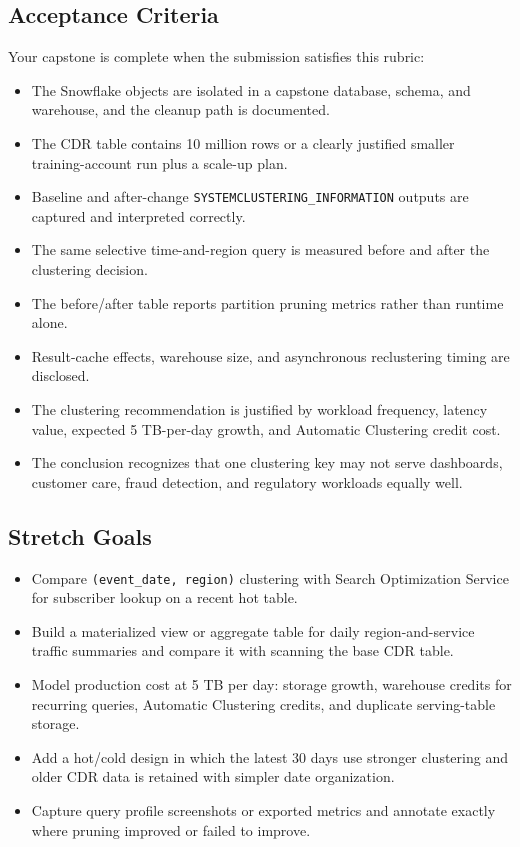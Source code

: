 \subsection*{Acceptance Criteria}
Your capstone is complete when the submission satisfies this rubric:
\begin{itemize}
    \item The Snowflake objects are isolated in a capstone database, schema, and warehouse, and the cleanup path is documented.
    \item The CDR table contains 10 million rows or a clearly justified smaller training-account run plus a scale-up plan.
    \item Baseline and after-change \texttt{SYSTEM\textdollar CLUSTERING\_INFORMATION} outputs are captured and interpreted correctly.
    \item The same selective time-and-region query is measured before and after the clustering decision.
    \item The before/after table reports partition pruning metrics rather than runtime alone.
    \item Result-cache effects, warehouse size, and asynchronous reclustering timing are disclosed.
    \item The clustering recommendation is justified by workload frequency, latency value, expected 5 TB-per-day growth, and Automatic Clustering credit cost.
    \item The conclusion recognizes that one clustering key may not serve dashboards, customer care, fraud detection, and regulatory workloads equally well.
\end{itemize}

\subsection*{Stretch Goals}
\begin{itemize}
    \item Compare \texttt{(event\_date, region)} clustering with Search Optimization Service for subscriber lookup on a recent hot table.
    \item Build a materialized view or aggregate table for daily region-and-service traffic summaries and compare it with scanning the base CDR table.
    \item Model production cost at 5 TB per day: storage growth, warehouse credits for recurring queries, Automatic Clustering credits, and duplicate serving-table storage.
    \item Add a hot/cold design in which the latest 30 days use stronger clustering and older CDR data is retained with simpler date organization.
    \item Capture query profile screenshots or exported metrics and annotate exactly where pruning improved or failed to improve.
\end{itemize}
